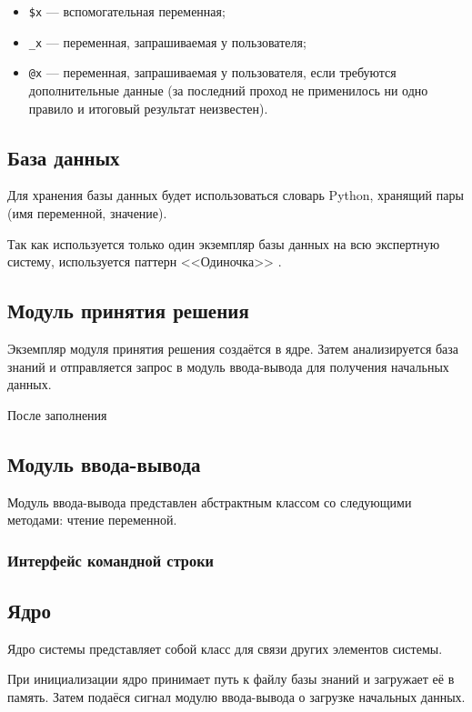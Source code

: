 \begin{itemize}
	\item \texttt{\$x} --- вспомогательная переменная;
	\item \texttt{\_x} --- переменная, запрашиваемая у пользователя;
	\item \texttt{@x} --- переменная, запрашиваемая у пользователя, если требуются дополнительные данные (за последний проход не применилось ни одно правило и итоговый результат неизвестен).
\end{itemize}

\subsection{База данных}

Для хранения базы данных будет использоваться словарь Python, хранящий пары (имя переменной, значение).

Так как используется только один экземпляр базы данных на всю экспертную систему, используется паттерн <<Одиночка>> \cite{gammaDesignPatternsElements1995}.

\subsection{Модуль принятия решения}

Экземпляр модуля принятия решения создаётся в ядре.
Затем анализируется база знаний и отправляется запрос в модуль ввода-вывода для получения начальных данных.

После заполнения

\subsection{Модуль ввода-вывода}

Модуль ввода-вывода представлен абстрактным классом со следующими методами: чтение переменной.

\subsubsection{Интерфейс командной строки}

\subsection{Ядро}

Ядро системы представляет собой класс для связи других элементов системы.

При инициализации ядро принимает путь к файлу базы знаний и загружает её в память.
Затем подаёся сигнал модулю ввода-вывода о загрузке начальных данных.
